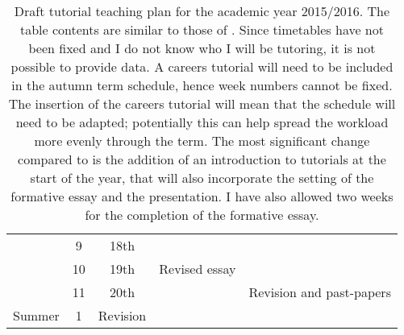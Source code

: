 \begin{table}
\begin{tabular}{c c c l l}
			 & \hphantom{0}9  & 18th		&			& \\
			 & 10		  & 19th		& Revised essay		& \\
			 & 11		  & 20th		&			& Revision and past-papers \\
\midrule
\multirow{1}{*}{Summer}	 & \hphantom{0}1  & Revision		&			& \\
 \bottomrule
\end{tabular}
\caption{Draft tutorial teaching plan for the academic year 2015/2016. The table contents are similar to those of . Since timetables have not been fixed and I do not know who I will be tutoring, it is not possible to provide data. A careers tutorial will need to be included in the autumn term schedule, hence week numbers cannot be fixed. The insertion of the careers tutorial will mean that the schedule will need to be adapted; potentially this can help spread the workload more evenly through the term. The most significant change compared to  is the addition of an introduction to tutorials at the start of the year, that will also incorporate the setting of the formative essay and the presentation. I have also allowed two weeks for the completion of the formative essay.}\label{tab:2015-16}
\end{table}
